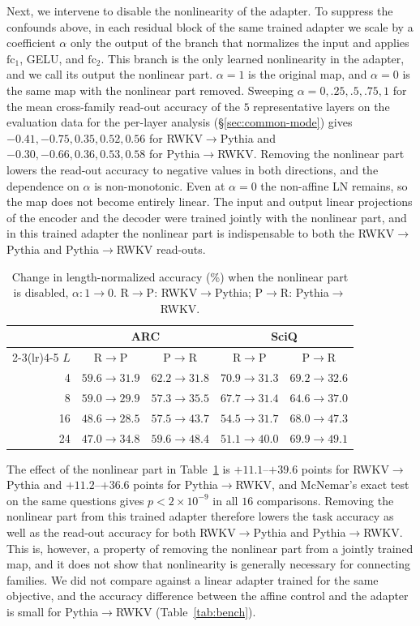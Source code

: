 \documentclass[conference]{IEEEtran}
\newcommand{\tabref}[1]{Table~\ref{#1}}
\newcommand{\RtoP}{RWKV$\to$\allowbreak Pythia}
\newcommand{\PtoR}{Pythia$\to$\allowbreak RWKV}
\begin{document}
Next, we intervene to disable the nonlinearity of the adapter. To suppress the confounds above, in each residual block of the same trained
adapter we scale by a coefficient $\alpha$ only the output of the branch that normalizes the input and applies $\mathrm{fc}_1$, GELU,
and $\mathrm{fc}_2$. This branch is the only learned nonlinearity in the adapter, and we call its output the nonlinear part. $\alpha{=}1$ is the original map, and
$\alpha{=}0$ is the same map with the nonlinear part removed.
Sweeping $\alpha=0,.25,.5,.75,1$ for the mean cross-family read-out accuracy of the $5$ representative layers on the evaluation data for
the per-layer analysis (\S\ref{sec:common-mode}) gives
$-0.41,-0.75,0.35,0.52,0.56$ for \RtoP{} and $-0.30,-0.66,0.36,0.53,0.58$ for \PtoR{}.
Removing the nonlinear part lowers the read-out accuracy to negative values in both directions, and the dependence on $\alpha$ is
non-monotonic. Even at $\alpha{=}0$ the non-affine LN remains, so the map does not become entirely linear. The input and output linear projections of the encoder and the decoder were
trained jointly with the nonlinear part, and in this trained adapter the nonlinear part is indispensable to both the \RtoP{} and
\PtoR{} read-outs.

\begin{table}[!t]\centering\small
\caption{Change in length-normalized accuracy (\%) when the nonlinear part is disabled, $\alpha:1\!\to\!0$. R$\to$P: RWKV$\to$Pythia; P$\to$R: Pythia$\to$RWKV.}\label{tab:mlp-intervention}
\setlength{\tabcolsep}{3pt}
\begin{tabular}{rcccc}\toprule
& \multicolumn{2}{c}{ARC} & \multicolumn{2}{c}{SciQ}\\
\cmidrule(lr){2-3}\cmidrule(lr){4-5}
$L$ & R$\to$P & P$\to$R & R$\to$P & P$\to$R\\\midrule
4  & $59.6\!\to\!31.9$ & $62.2\!\to\!31.8$ & $70.9\!\to\!31.3$ & $69.2\!\to\!32.6$\\
8  & $59.0\!\to\!29.9$ & $57.3\!\to\!35.5$ & $67.7\!\to\!31.4$ & $64.6\!\to\!37.0$\\
16 & $48.6\!\to\!28.5$ & $57.5\!\to\!43.7$ & $54.5\!\to\!31.7$ & $68.0\!\to\!47.3$\\
24 & $47.0\!\to\!34.8$ & $59.6\!\to\!48.4$ & $51.1\!\to\!40.0$ & $69.9\!\to\!49.1$\\\bottomrule
\end{tabular}
\end{table}

The effect of the nonlinear part in \tabref{tab:mlp-intervention} is $+11.1$--$+39.6$ points for \RtoP{} and
$+11.2$--$+36.6$ points for \PtoR{}, and McNemar's exact test on the same questions gives
$p<2{\times}10^{-9}$ in all $16$ comparisons. Removing the nonlinear part from this trained adapter therefore lowers the task accuracy
as well as the read-out accuracy for both \RtoP{} and \PtoR{}. This is, however, a property of removing the nonlinear part from a
jointly trained map, and it does not show that nonlinearity is generally necessary for connecting families.
We did not compare against a linear adapter trained for the same objective, and the accuracy difference between the affine control and the
adapter is small for \PtoR{} (\tabref{tab:bench}).
\end{document}
